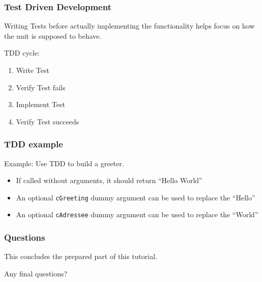 \begin{frame}
    \frametitle{Test Driven Development}
    Writing Tests before actually implementing the functionality helps focus on
    how the unit is supposed to behave.

    TDD cycle:
    \begin{enumerate}
        \item{Write Test}
        \item{Verify Test fails}
        \item{Implement Test}
        \item{Verify Test succeeds}
    \end{enumerate}
\end{frame}

\begin{frame}
    \frametitle{TDD example}
    Example: Use TDD to build a greeter.
    \begin{itemize}
        \item If called without arguments, it should return ``Hello World''
        \item An optional \texttt{cGreeting} dummy argument can be used to replace the ``Hello''
        \item An optional \texttt{cAdressee} dummy argument can be used to replace the ``World''
    \end{itemize}
\end{frame}

\begin{frame}
    \frametitle{Questions}
    This concludes the prepared part of this tutorial.

    Any final questions?
\end{frame}
